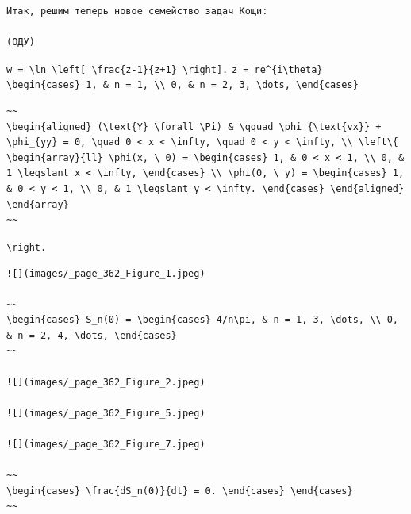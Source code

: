 \documentclass[
  ukrainian,
]{article}
\begin{document}
\begin{verbatim}
Итак, решим теперь новое семейство задач Кощи:

(ОДУ)
\end{verbatim}

\texttt{w\ =\ \textbackslash{}ln\ \textbackslash{}left{[}\ \textbackslash{}frac\{z-1\}\{z+1\}\ \textbackslash{}right{]}.}
\texttt{z\ =\ re\^{}\{i\textbackslash{}theta\}}
\texttt{\textbackslash{}begin\{cases\}\ 1,\ \&\ n\ =\ 1,\ \textbackslash{}\textbackslash{}\ 0,\ \&\ n\ =\ 2,\ 3,\ \textbackslash{}dots,\ \textbackslash{}end\{cases\}}

\begin{verbatim}
~~
\begin{aligned} (\text{Y} \forall \Pi) & \qquad \phi_{\text{vx}} + \phi_{yy} = 0, \quad 0 < x < \infty, \quad 0 < y < \infty, \\ \left\{ \begin{array}{ll} \phi(x, \ 0) = \begin{cases} 1, & 0 < x < 1, \\ 0, & 1 \leqslant x < \infty, \end{cases} \\ \phi(0, \ y) = \begin{cases} 1, & 0 < y < 1, \\ 0, & 1 \leqslant y < \infty. \end{cases} \end{aligned} \end{array}
~~
\end{verbatim}

\texttt{\textbackslash{}right.}

\begin{verbatim}
![](images/_page_362_Figure_1.jpeg)

~~
\begin{cases} S_n(0) = \begin{cases} 4/n\pi, & n = 1, 3, \dots, \\ 0, & n = 2, 4, \dots, \end{cases}
~~

![](images/_page_362_Figure_2.jpeg)

![](images/_page_362_Figure_5.jpeg)

![](images/_page_362_Figure_7.jpeg)

~~
\begin{cases} \frac{dS_n(0)}{dt} = 0. \end{cases} \end{cases}
~~
\end{verbatim}
\end{document}
